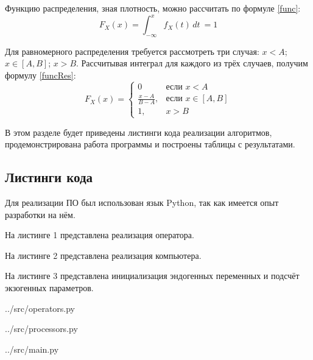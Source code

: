 Функцию распределения, зная плотность, можно рассчитать по формуле \ref{func}:
\begin{equation}
	\label{func}
	F_X(x) = \int_{-\infty}^{x} f_X(t) \,dt \ = 1
\end{equation}

Для равномерного распределения требуется рассмотреть три случая: $x < A$; $x \in [A, B]$; $x > B$. Рассчитывая интеграл для каждого из трёх случаев, получим формулу \ref{funcRes}:
\begin{equation}
	\label{funcRes}
	F_X(x)= 
	\begin{cases}
		0 & \text{если } x < A\\
		\frac{x - A}{B - A},& \text{если } x \in [A, B]\\
		1,              & x > B
	\end{cases}
\end{equation}

\newpage


В этом разделе будет приведены листинги кода реализации алгоритмов, продемонстрирована работа программы и построены таблицы с результатами.

\subsection*{Листинги кода}
Для реализации ПО был использован язык Python, так как имеется опыт разработки на нём.

На листинге 1 представлена реализация оператора.

На листинге 2 представлена реализация компьютера.

На листинге 3 представлена инициализация эндогенных переменных и подсчёт экзогенных параметров. 


\begin{lstinputlisting}[language=Python, caption=Реализация преподавателя, linerange={24-36}, 
	basicstyle=\footnotesize\ttfamily, frame=single,breaklines=true]{../src/operators.py}
\end{lstinputlisting}
\FloatBarrier


\FloatBarrier
\begin{lstinputlisting}[language=Python, caption=Реализация магистра, linerange={14-22}, 
	basicstyle=\footnotesize\ttfamily, frame=single, breaklines=true]{../src/processors.py}
\end{lstinputlisting}
\FloatBarrier

\FloatBarrier
\begin{lstinputlisting}[language=Python, caption=Инициализация эндогенных переменных и подсчёт экзогенных параметров, linerange={5-17}, basicstyle=\footnotesize\ttfamily, frame=single, breaklines=true]{../src/main.py}
\end{lstinputlisting}
\FloatBarrier


